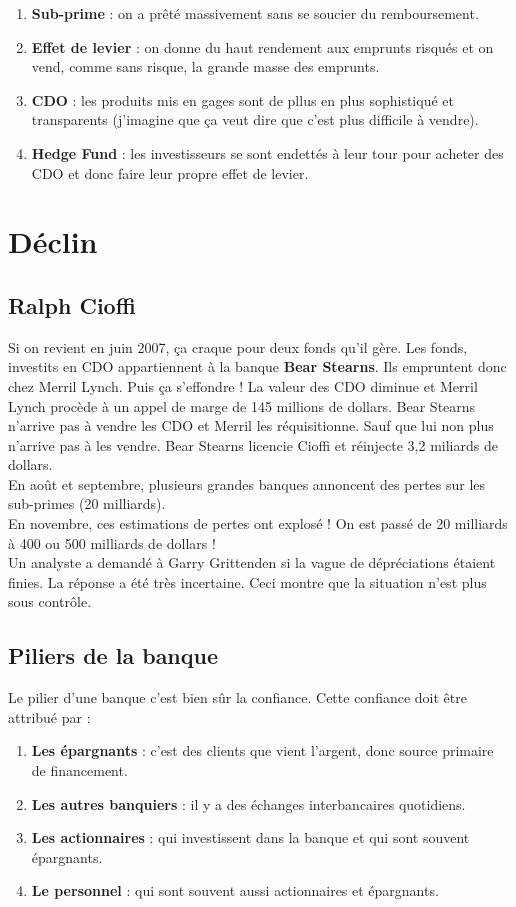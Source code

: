 \begin{enumerate}
	\item \textbf{Sub-prime} : on a prêté massivement sans se soucier du remboursement.
	      
	\item \textbf{Effet de levier} : on donne du haut rendement aux emprunts risqués et on vend, comme sans risque, la grande masse des emprunts. 
	      
	\item \textbf{CDO} : les produits mis en gages sont de pllus en plus sophistiqué et transparents (j'imagine que ça veut dire que c'est plus difficile à vendre).
	      
	\item \textbf{Hedge Fund} : les investisseurs se sont endettés à leur tour pour acheter des CDO et donc faire leur propre effet de levier.
\end{enumerate}

\section{Déclin}
\subsection{Ralph Cioffi}
Si on revient en juin 2007, ça craque pour deux fonds qu'il gère. Les fonds, investits en CDO appartiennent à la banque \textbf{Bear Stearns}. Ils empruntent donc chez Merril Lynch. Puis ça s'effondre ! La valeur des CDO diminue et Merril Lynch procède à un appel de marge de 145 millions de dollars. Bear Stearns n'arrive pas à vendre les CDO et Merril les réquisitionne. Sauf que lui non plus n'arrive pas à les vendre. Bear Stearns licencie Cioffi et réinjecte 3,2 miliards de dollars. \\
En août et septembre, plusieurs grandes banques annoncent des pertes sur les sub-primes (20 milliards). \\
En novembre, ces estimations de pertes ont explosé ! On est passé de 20 milliards à 400 ou 500 milliards de dollars ! \\
Un analyste a demandé à Garry Grittenden si la vague de dépréciations étaient finies. La réponse a été très incertaine. Ceci montre que la situation n'est plus sous contrôle. 

\subsection{Piliers de la banque}
Le pilier d'une banque c'est bien sûr la confiance. Cette confiance doit être attribué par : 
\begin{enumerate}
	\item \textbf{Les épargnants} : c'est des clients que vient l'argent, donc source primaire de financement.
	\item \textbf{Les autres banquiers} : il y a des échanges interbancaires quotidiens.
	\item \textbf{Les actionnaires} : qui investissent dans la banque et qui sont souvent épargnants.
	\item \textbf{Le personnel} : qui sont souvent aussi actionnaires et épargnants. 
\end{enumerate}

